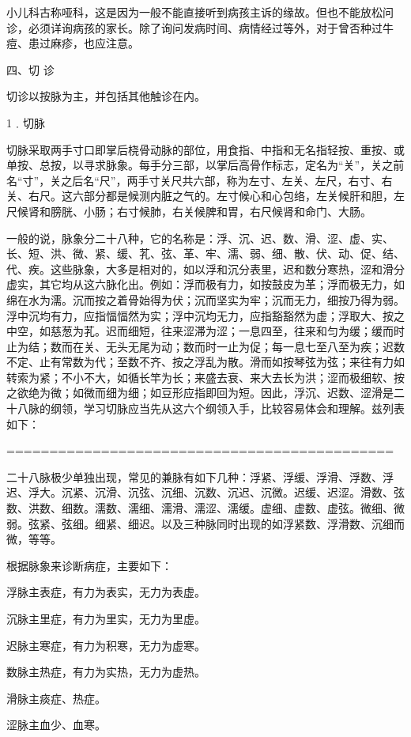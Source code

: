 \documentclass[a4paper,12pt,UTF8,twoside]{ctexbook}
\begin{document}
小儿科古称哑科，这是因为一般不能直接听到病孩主诉的缘故。但也不能放松问诊，必须详询病孩的家长。除了询问发病时间、病情经过等外，对于曾否种过牛痘、患过麻疹，也应注意。

四、切 诊

切诊以按脉为主，并包括其他触诊在内。

1﹒切脉

切脉采取两手寸口即掌后桡骨动脉的部位，用食指、中指和无名指轻按、重按、或单按、总按，以寻求脉象。每手分三部，以掌后高骨作标志，定名为“关”，关之前名“寸”，关之后名“尺”，两手寸关尺共六部，称为左寸、左关、左尺，右寸、右关、右尺。这六部分都是候测内脏之气的。左寸候心和心包络，左关候肝和胆，左尺候肾和膀胱、小肠；右寸候肺，右关候脾和胃，右尺候肾和命门、大肠。

一般的说，脉象分二十八种，它的名称是：浮、沉、迟、数、滑、涩、虚、实、长、短、洪、微、紧、缓、芤、弦、革、牢、濡、弱、细、散、伏、动、促、结、代、疾。这些脉象，大多是相对的，如以浮和沉分表里，迟和数分寒热，涩和滑分虚实，其它均从这六脉化出。例如：浮而极有力，如按鼓皮为革；浮而极无力，如绵在水为濡。沉而按之着骨始得为伏；沉而坚实为牢；沉而无力，细按乃得为弱。浮中沉均有力，应指愊愊然为实；浮中沉均无力，应指豁豁然为虚；浮取大、按之中空，如慈葱为芤。迟而细短，往来涩滞为涩；一息四至，往来和匀为缓；缓而时止为结；数而在关、无头无尾为动；数而时一止为促；每一息七至八至为疾；迟数不定、止有常数为代；至数不齐、按之浮乱为散。滑而如按琴弦为弦；来往有力如转索为紧；不小不大，如循长竿为长；来盛去衰、来大去长为洪；涩而极细软、按之欲绝为微；如微而细为细；如豆形应指即回为短。因此，浮沉、迟数、涩滑是二十八脉的纲领，学习切脉应当先从这六个纲领入手，比较容易体会和理解。兹列表如下：

=============================================

二十八脉极少单独出现，常见的兼脉有如下几种：浮紧、浮缓、浮滑、浮数、浮迟、浮大。沉紧、沉滑、沉弦、沉细、沉数、沉迟、沉微。迟缓、迟涩。滑数、弦数、洪数、细数。濡数、濡细、濡滑、濡涩、濡缓。虚细、虚数、虚弦。微细、微弱。弦紧、弦细。细紧、细迟。以及三种脉同时出现的如浮紧数、浮滑数、沉细而微，等等。

根据脉象来诊断病症，主要如下：

浮脉主表症，有力为表实，无力为表虚。

沉脉主里症，有力为里实，无力为里虚。

迟脉主寒症，有力为积寒，无力为虚寒。

数脉主热症，有力为实热，无力为虚热。

滑脉主痰症、热症。

涩脉主血少、血寒。
\end{document}

